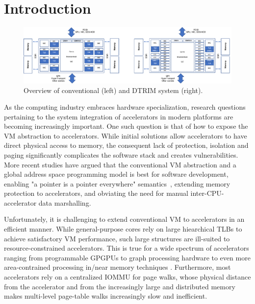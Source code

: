 \section{Introduction}
\label{sec:intro}

\begin{figure}
\centering
 \includegraphics[width=1\textwidth,clip]{figures/overview.pdf}
 \caption{Overview of conventional (left) and DTRIM system (right).}
\label{fig:overview}
\end{figure}

As the computing industry embraces hardware specialization, research
questions pertaining to the system integration of accelerators in
modern platforms are becoming increasingly important. One such
question is that of how to expose the VM abstraction
to accelerators. While initial solutions allow accelerators to have
direct physical access to memory, the consequent lack of protection,
isolation and paging significantly complicates the software
stack and creates vulnerabilities. More recent studies have argued that the conventional VM
abstraction and a global address space programming model is best for
software development, enabling "a pointer is a pointer everywhere"
semantics~\cite{pichai:architectural, power:supporting,
  haria:devirtualizing, vesely:observation, ausavarungnirun:mosaic},
extending memory protection to accelerators, and obviating the need
for manual inter-CPU-accelerator data marshalling.

Unfortunately, it is challenging to extend conventional VM to
accelerators in an efficient manner. While general-purpose cores rely
on large hiearchical TLBs to achieve satisfactory VM performance, such
large structures are ill-suited to resource-constrained
accelerators. This is true for a wide spectrum of accelerators ranging
from programmable GPGPUs \cite{pichai:architectural, power:supporting}
to graph processing hardware \cite{haria:devirtualizing} to even more
area-contrained processing in/near memory techniques
\cite{picorel:near-memory}. Furthermore, most accelerators rely on a centralized 
IOMMU for page walks, whose physical distance from the accelerator and from the increasingly 
large and distributed memory makes multi-level page-table walks increasingly slow and inefficient. 


